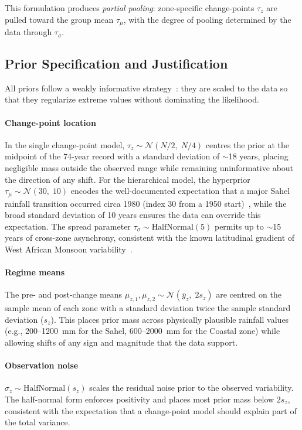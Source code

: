 \documentclass[conference]{IEEEtran}
\begin{document}
This formulation produces \emph{partial pooling}: zone-specific change-points $\tau_z$ are pulled toward the group mean $\tau_\mu$, with the degree of pooling determined by the data through $\tau_\sigma$.

\subsection{Prior Specification and Justification}

All priors follow a weakly informative strategy~\cite{gelman2006data}: they are scaled to the data so that they regularize extreme values without dominating the likelihood.

\paragraph{Change-point location}
In the single change-point model, $\tau_z \sim \mathcal{N}(N/2,\; N/4)$ centres the prior at the midpoint of the 74-year record with a standard deviation of $\sim$18 years, placing negligible mass outside the observed range while remaining uninformative about the direction of any shift. For the hierarchical model, the hyperprior $\tau_\mu \sim \mathcal{N}(30,\; 10)$ encodes the well-documented expectation that a major Sahel rainfall transition occurred circa 1980 (index 30 from a 1950 start)~\cite{nicholson2013west}, while the broad standard deviation of 10 years ensures the data can override this expectation. The spread parameter $\tau_\sigma \sim \text{HalfNormal}(5)$ permits up to $\sim$15 years of cross-zone asynchrony, consistent with the known latitudinal gradient of West African Monsoon variability~\cite{lebel2009recent}.

\paragraph{Regime means}
The pre- and post-change means $\mu_{z,1}, \mu_{z,2} \sim \mathcal{N}(\bar{y}_z,\; 2s_z)$ are centred on the sample mean of each zone with a standard deviation twice the sample standard deviation ($s_z$). This places prior mass across physically plausible rainfall values (e.g., 200--1200~mm for the Sahel, 600--2000~mm for the Coastal zone) while allowing shifts of any sign and magnitude that the data support.

\paragraph{Observation noise}
$\sigma_z \sim \text{HalfNormal}(s_z)$ scales the residual noise prior to the observed variability. The half-normal form enforces positivity and places most prior mass below $2s_z$, consistent with the expectation that a change-point model should explain part of the total variance.
\end{document}
